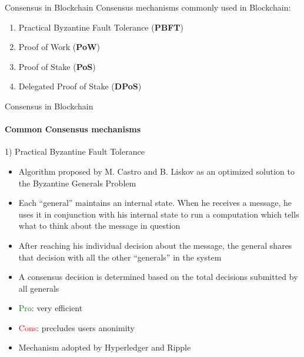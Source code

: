 \documentclass{beamer}
\newcommand\red[1]{\textcolor{red}{#1}}
\begin{document}
  
  
  \begin{frame}{Consensus in Blockchain}
      Consensus mechanisms commonly used in Blockchain:
      \begin{enumerate}
        \item Practical Byzantine Fault Tolerance (\textbf{PBFT})
        \item Proof of Work (\textbf{PoW})
        \item Proof of Stake (\textbf{PoS})
        \item Delegated Proof of Stake (\textbf{DPoS})
      \end{enumerate}
  \end{frame}




  \begin{frame}{Consensus in Blockchain}
    \framesubtitle{Common Consensus mechanisms}
    \begin{block}{1) Practical Byzantine Fault Tolerance}
      \begin{itemize}
        \item Algorithm proposed by M. Castro and B. Liskov as an optimized
        solution to the Byzantine Generals Problem \cite{castro1999practical} 
        \item Each “general” maintains an internal state. When he receives a
        message, he uses it in conjunction with his internal state to
        run a computation which tells what to think about the message in question 
        \item  After reaching his individual decision about the message,
        the general shares that decision with all the other “generals” in the system 
        \item  A consensus decision is determined based on the total decisions
        submitted by all generals \pause
        \item \textcolor{green}{Pro}: very efficient \pause
        \item \red{Cons}: precludes users anonimity \pause
        \item Mechanism adopted by Hyperledger and Ripple
      \end{itemize}
    \end{block}
  \end{frame}
\end{document}
